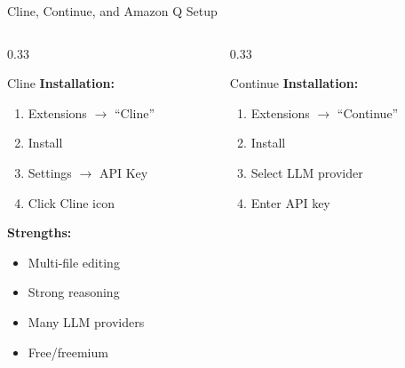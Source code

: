\documentclass[aspectratio=169,11pt]{beamer}
\begin{document}
\begin{frame}{Cline, Continue, and Amazon Q Setup}
    \begin{columns}[T]
        \begin{column}{0.33\textwidth}
            \begin{block}{Cline}
                \textbf{Installation:}
                \begin{enumerate}
                    \item Extensions $\rightarrow$ ``Cline''
                    \item Install
                    \item Settings $\rightarrow$ API Key
                    \item Click Cline icon
                \end{enumerate}

                \vspace{0.2cm}
                \textbf{Strengths:}
                \begin{itemize}
                    \item Multi-file editing
                    \item Strong reasoning
                    \item Many LLM providers
                    \item Free/freemium
                \end{itemize}
            \end{block}
        \end{column}
        \begin{column}{0.33\textwidth}
            \begin{block}{Continue}
                \textbf{Installation:}
                \begin{enumerate}
                    \item Extensions $\rightarrow$ ``Continue''
                    \item Install
                    \item Select LLM provider
                    \item Enter API key
                \end{enumerate}


\end{block}
\end{column}
\end{columns}
\end{frame}
\end{document}
